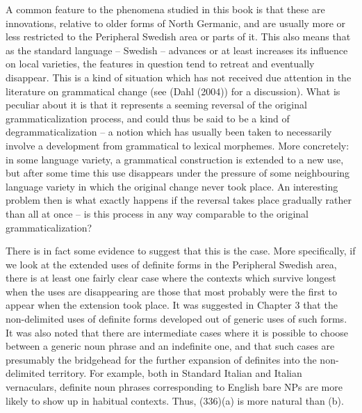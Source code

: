 A common feature to the phenomena studied in this book is that these are innovations, relative to older forms of North Germanic, and are usually more or less restricted to the Peripheral Swedish area or parts of it. This also means that as the standard language – Swedish – advances or at least increases its influence on local varieties, the features in question tend to retreat and eventually disappear. This is a kind of situation which has not received due attention in the literature on grammatical change (see (Dahl (2004)) for a discussion). What is peculiar about it is that it represents a seeming reversal of the original grammaticalization process, and could thus be said to be a kind of degrammaticalization – a notion which has usually been taken to necessarily involve a development from grammatical to lexical morphemes. More concretely: in some language variety, a grammatical construction is extended to a new use, but after some time this use disappears under the pressure of some neighbouring language variety in which the original change never took place. An interesting problem then is what exactly happens if the reversal takes place gradually rather than all at once – is this process in any way comparable to the original grammaticalization?

There is in fact some evidence to suggest that this is the case. More specifically, if we look at the extended uses of definite forms in the Peripheral Swedish area, there is at least one fairly clear case where the contexts which survive longest when the uses are disappearing are those that most probably were the first to appear when the extension took place. It was suggested in Chapter 3 that the non-delimited uses of definite forms developed out of generic uses of such forms. It was also noted that there are intermediate cases where it is possible to choose between a generic noun phrase and an indefinite one, and that such cases are presumably the bridgehead for the further expansion of definites into the non-delimited territory. For example, both in Standard Italian and Italian vernaculars, definite noun phrases corresponding to English bare NPs are more likely to show up in habitual contexts. Thus, (336)(a) is more natural than (b).

